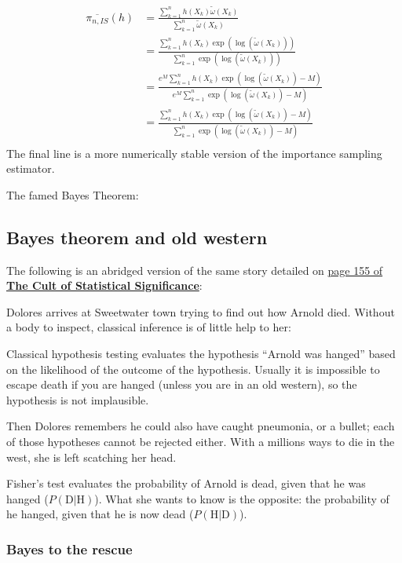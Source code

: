 \documentclass[]{article}
\begin{document}
\[
\begin{aligned}
\overline{\pi_{n, IS}}(h) 
&= \frac{\sum_{k=1}^n{h(X_k)\tilde{\omega}(X_k)}}{\sum_{k=1}^n{\tilde{\omega}(X_k)}}\\
&= \frac{\sum_{k=1}^n{h(X_k)\exp(\log(\tilde{\omega}(X_k)))}}{\sum_{k=1}^n{\exp(\log(\tilde{\omega}(X_k)))}}\\
&= \frac{e^M\sum_{k=1}^n{h(X_k)\exp(\log(\tilde{\omega}(X_k))-M)}}{e^M\sum_{k=1}^n{\exp(\log(\tilde{\omega}(X_k))-M)}}\\
&= \frac{\sum_{k=1}^n{h(X_k)\exp(\log(\tilde{\omega}(X_k))-M)}}{\sum_{k=1}^n{\exp(\log(\tilde{\omega}(X_k))-M)}}\\
\end{aligned}
\] The final line is a more numerically stable version of the importance
sampling estimator.

The famed Bayes Theorem:

\subsection{Bayes theorem and old
western}\label{bayes-theorem-and-old-western}

The following is an abridged version of the same story detailed on
\href{https://books.google.com/books?id=JWLIRr_ROgAC\&pg=PA155\#v=onepage\&q\&f=false}{page
155 of \textbf{The Cult of Statistical Significance}}:

Dolores arrives at Sweetwater town trying to find out how Arnold died.
Without a body to inspect, classical inference is of little help to her:

Classical hypothesis testing evaluates the hypothesis ``Arnold was
hanged'' based on the likelihood of the outcome of the hypothesis.
Usually it is impossible to escape death if you are hanged (unless you
are in an old western), so the hypothesis is not implausible.

Then Dolores remembers he could also have caught pneumonia, or a bullet;
each of those hypotheses cannot be rejected either. With a millions ways
to die in the west, she is left scatching her head.

Fisher's test evaluates the probability of Arnold is dead, given that he
was hanged (\(P(\mbox{D}|\mbox{H})\)). What she wants to know is the
opposite: the probability of he hanged, given that he is now dead
(\(P(\mbox{H}|\mbox{D})\)).

\subsubsection{Bayes to the rescue}\label{bayes-to-the-rescue}
\end{document}
